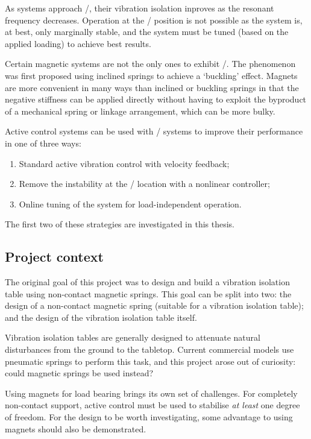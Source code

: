 As systems approach \qzs/, their vibration isolation inproves as the resonant frequency decreases.
Operation at the \qzs/ position is not possible as the system is, at best, only marginally stable, and the system must be tuned (based on the applied loading) to achieve best results.

Certain magnetic systems are not the only ones to exhibit \qzs/.
The phenomenon was first proposed using inclined springs to achieve a `buckling' effect.
Magnets are more convenient in many ways than inclined or buckling springs in that the negative stiffness can be applied directly without having to exploit the byproduct of a mechanical spring or linkage arrangement, which can be more bulky.

Active control systems can be used with \qzs/ systems to improve their  performance in one of three ways:
\begin{enumerate}
  \item Standard active vibration control with velocity feedback;
  \item Remove the instability at the \qzs/ location with a nonlinear controller;
  \item Online tuning of the system for load-independent operation.
\end{enumerate}
The first two of these strategies are investigated in this thesis.


\subsection{Project context}

The original goal of this project was to design and build a vibration isolation table using non-contact magnetic springs.
This goal can be split into two: the design of a non-contact magnetic spring (suitable for a vibration isolation table); and the design of the vibration isolation table itself.

Vibration isolation tables are generally designed to attenuate natural disturbances from the ground to the tabletop.
Current commercial models use pneumatic springs to perform this task, and this project arose out of curiosity: could magnetic springs be used instead?

Using magnets for load bearing brings its own set of challenges.
For completely non-contact support, active control must be used to stabilise \emph{at least} one degree of freedom.
For the design to be worth investigating, some advantage to using magnets should also be demonstrated.

